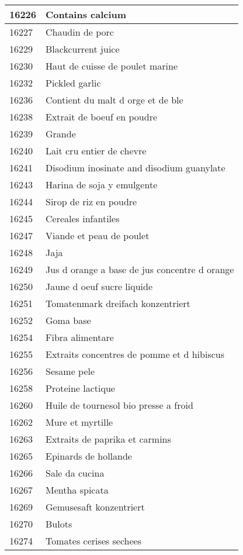 \begin{longtable}{|l|l|}
16226 & Contains calcium \\ \hline 
16227 & Chaudin de porc \\ \hline 
16229 & Blackcurrent juice \\ \hline 
16230 & Haut de cuisse de poulet marine \\ \hline 
16232 & Pickled garlic \\ \hline 
16236 & Contient du malt d orge et de ble \\ \hline 
16238 & Extrait de boeuf en poudre \\ \hline 
16239 & Grande \\ \hline 
16240 & Lait cru entier de chevre \\ \hline 
16241 & Disodium inosinate and disodium guanylate \\ \hline 
16243 & Harina de soja y emulgente \\ \hline 
16244 & Sirop de riz en poudre \\ \hline 
16245 & Cereales infantiles \\ \hline 
16247 & Viande et peau de poulet \\ \hline 
16248 & Jaja \\ \hline 
16249 & Jus d orange a base de jus concentre d orange \\ \hline 
16250 & Jaune d oeuf sucre liquide \\ \hline 
16251 & Tomatenmark dreifach konzentriert \\ \hline 
16252 & Goma base \\ \hline 
16254 & Fibra alimentare \\ \hline 
16255 & Extraits concentres de pomme et d hibiscus \\ \hline 
16256 & Sesame pele \\ \hline 
16258 & Proteine lactique \\ \hline 
16260 & Huile de tournesol bio presse a froid \\ \hline 
16262 & Mure et myrtille \\ \hline 
16263 & Extraits de paprika et carmins \\ \hline 
16265 & Epinards de hollande \\ \hline 
16266 & Sale da cucina \\ \hline 
16267 & Mentha spicata \\ \hline 
16269 & Gemusesaft konzentriert \\ \hline 
16270 & Bulots \\ \hline 
16274 & Tomates cerises sechees \\ \hline 

\end{longtable}
